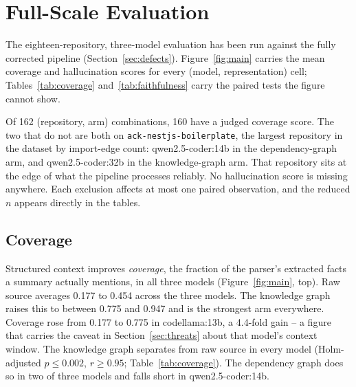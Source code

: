 \documentclass[conference]{IEEEtran}
\begin{document}
\section{Full-Scale Evaluation}
\label{sec:results}

The eighteen-repository, three-model evaluation has been run against the fully corrected
pipeline (Section~\ref{sec:defects}). Figure~\ref{fig:main} carries the mean coverage and
hallucination scores for every (model, representation) cell;
Tables~\ref{tab:coverage} and~\ref{tab:faithfulness} carry the paired tests the figure cannot
show.

Of 162 (repository, arm) combinations, 160 have a judged coverage score. The two that do not are
both on \texttt{ack-nestjs-boilerplate}, the largest repository in the dataset by import-edge
count: qwen2.5-coder:14b in the dependency-graph arm, and qwen2.5-coder:32b in the
knowledge-graph arm. That repository sits at the edge of what the pipeline processes reliably.
No hallucination score is missing anywhere. Each exclusion affects at most one paired
observation, and the reduced $n$ appears directly in the tables.

\subsection{Coverage}
Structured context improves \emph{coverage}, the fraction of the parser's extracted facts a
summary actually mentions, in all three models (Figure~\ref{fig:main}, top). Raw source averages
0.177 to 0.454 across the three models. The knowledge graph raises this to between 0.775 and
0.947 and is the strongest arm everywhere. Coverage rose from 0.177 to 0.775 in codellama:13b, a
4.4-fold gain -- a figure that carries the caveat in Section~\ref{sec:threats} about that
model's context window. The knowledge graph separates from raw source in every model
(Holm-adjusted $p\le0.002$, $r\ge0.95$; Table~\ref{tab:coverage}). The dependency graph does so
in two of three models and falls short in qwen2.5-coder:14b.
\end{document}
